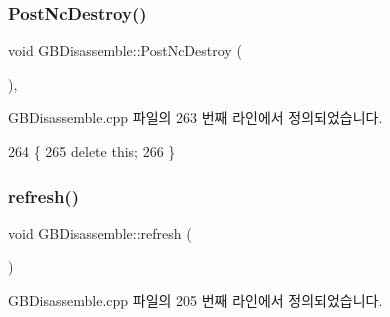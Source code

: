 \subsubsection{\texorpdfstring{Post\+Nc\+Destroy()}{PostNcDestroy()}}
{\footnotesize\ttfamily void G\+B\+Disassemble\+::\+Post\+Nc\+Destroy (\begin{DoxyParamCaption}{ }\end{DoxyParamCaption})\hspace{0.3cm}{\ttfamily [protected]}, {\ttfamily [virtual]}}



G\+B\+Disassemble.\+cpp 파일의 263 번째 라인에서 정의되었습니다.


\begin{DoxyCode}
264 \{
265   \textcolor{keyword}{delete} \textcolor{keyword}{this};
266 \}
\end{DoxyCode}
\mbox{\label{class_g_b_disassemble_a0ae217c08ead8a3cf62c59dadaa27fde}} 
\subsubsection{\texorpdfstring{refresh()}{refresh()}}
{\footnotesize\ttfamily void G\+B\+Disassemble\+::refresh (\begin{DoxyParamCaption}{ }\end{DoxyParamCaption})}



G\+B\+Disassemble.\+cpp 파일의 205 번째 라인에서 정의되었습니다.


